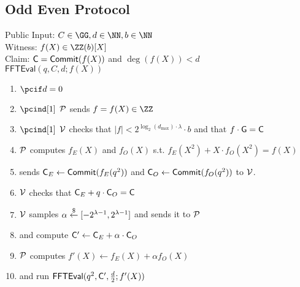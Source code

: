 \documentclass[12pt]{article}
\theoremstyle{Definition}
\begin{document}
\subsection{Odd Even Protocol}
\label{sec:oddeven}
\begin{mdframed}
Public Input: $C\in \GG, d \in \NN, b\in \NN$\\
Witness: $f(X) \in \ZZ(b)[X]$ \\
Claim: $\mathsf{C} =\textsf{{Commit}}(f(X))$ and $\deg(f(X))<d$	\\
$\textsf{FFTEval}(q,C,d;f(X))$
\begin{enumerate}[nolistsep]
		\item $\pcif d=0$
		\item $\pcind[1]$ $\mathcal{P}$ sends $f=f(X) \in \ZZ$
		\item $\pcind[1]$ $\mathcal{V}$ checks that $|f|<2^{\log_2(d_{\max}) \cdot \lambda} \cdot b$ and that $f \cdot \mathsf{G}=\mathsf{C}$
		\item $\mathcal{P}$ computes $f_E(X)$ and $f_O(X)$ s.t. $f_E(X^2)+X \cdot f_O(X^2)=f(X)$ 
		\item \prover sends $\mathsf{C}_E\gets \textsf{{Commit}}(f_E(q^2))$ and $\mathsf{C}_O\gets \textsf{{Commit}}(f_O(q^2))$ to $\mathcal{V}$. 
		\item $\mathcal{V}$ checks that $\mathsf{C}_E+ q\cdot \mathsf{C}_O=\mathsf{C}$ 
		\item $\mathcal{V}$ samples $\alpha \overset{\$}{\gets} [-2^{\lambda-1},2^{\lambda-1}]$ and sends it to $\mathcal{P}$
		\item \prover and \verifier compute $\mathsf{C}'\gets \mathsf{C}_E+\alpha \cdot \mathsf{C}_O$
		\item $\mathcal{P}$ computes $f'(X)\gets f_E(X)+\alpha f_O(X)$
		\item \prover and \verifier run $\textsf{FFTEval}(q^2,\mathsf{C}',\frac{d}{2};f'(X))$
	\end{enumerate}
\end{mdframed}
\end{document}
